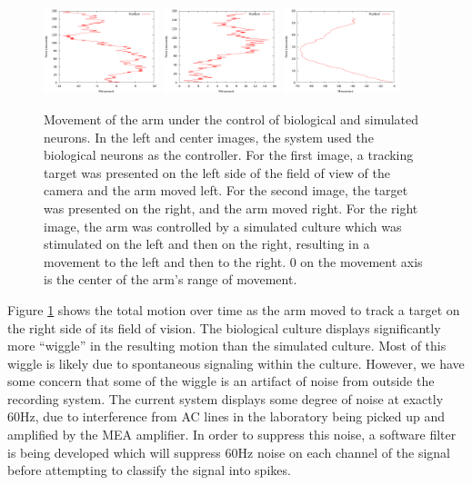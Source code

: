 \documentclass[letterpaper]{article}
\begin{document}
\begin{figure}
	\centering
	\includegraphics[width=0.3\textwidth]{bio_motion_446.png}
	\includegraphics[width=0.3\textwidth]{bio_motion_445.png}
	\includegraphics[width=0.3\textwidth]{simulated_motion.png}
	\caption{Movement of the arm under the control of biological and simulated neurons. In the left and center images, the system used the biological neurons as the controller. For the first image, a tracking target was presented on the left side of the field of view of the camera and the arm moved left. For the second image, the target was presented on the right, and the arm moved right. For the right image, the arm was controlled by a simulated culture which was stimulated on the left and then on the right, resulting in a movement to the left and then to the right. 0 on the movement axis is the center of the arm's range of movement.}
	\label{fig:motion_images}
\end{figure}

Figure \ref{fig:motion_images} shows the total motion over time as the arm moved to track a target on the right side of its field of vision. 
The biological culture displays significantly more ``wiggle'' in the resulting motion than the simulated culture.
Most of this wiggle is likely due to spontaneous signaling within the culture.
However, we have some concern that some of the wiggle is an artifact of noise from outside the recording system. 
The current system displays some degree of noise at exactly 60Hz, due to interference from AC lines in the laboratory being picked up and amplified by the MEA amplifier. 
In order to suppress this noise, a software filter is being developed which will suppress 60Hz noise on each channel of the signal before attempting to classify the signal into spikes. 
\end{document}
